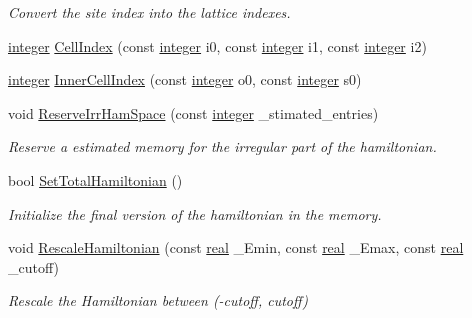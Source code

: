 \begin{DoxyCompactItemize}
\begin{DoxyCompactList}\small\item\em Convert the site index into the lattice indexes. \end{DoxyCompactList}\item 
\hyperlink{namespaceNumCal_ae1031b42812e871d8f5bd9b7b15fc7d8}{integer} \hyperlink{classNumCal_1_1Lattice_a35f73beef133e11d844a6632e582af65}{Cell\+Index} (const \hyperlink{namespaceNumCal_ae1031b42812e871d8f5bd9b7b15fc7d8}{integer} i0, const \hyperlink{namespaceNumCal_ae1031b42812e871d8f5bd9b7b15fc7d8}{integer} i1, const \hyperlink{namespaceNumCal_ae1031b42812e871d8f5bd9b7b15fc7d8}{integer} i2)
\item 
\hyperlink{namespaceNumCal_ae1031b42812e871d8f5bd9b7b15fc7d8}{integer} \hyperlink{classNumCal_1_1Lattice_af9b5d4ab5059d7e5bb3225d822881d9f}{Inner\+Cell\+Index} (const \hyperlink{namespaceNumCal_ae1031b42812e871d8f5bd9b7b15fc7d8}{integer} o0, const \hyperlink{namespaceNumCal_ae1031b42812e871d8f5bd9b7b15fc7d8}{integer} s0)
\item 
void \hyperlink{classNumCal_1_1Lattice_a9ec7fb19af2909219b0d82cdf26097a5}{Reserve\+Irr\+Ham\+Space} (const \hyperlink{namespaceNumCal_ae1031b42812e871d8f5bd9b7b15fc7d8}{integer} \+\_\+stimated\+\_\+entries)
\begin{DoxyCompactList}\small\item\em Reserve a estimated memory for the irregular part of the hamiltonian. \end{DoxyCompactList}\item 
bool \hyperlink{classNumCal_1_1Lattice_a6d68441bc15c6876230d3fac7bcdc26e}{Set\+Total\+Hamiltonian} ()
\begin{DoxyCompactList}\small\item\em Initialize the final version of the hamiltonian in the memory. \end{DoxyCompactList}\item 
void \hyperlink{classNumCal_1_1Lattice_a185a049be64061e61af9cf8aa98835db}{Rescale\+Hamiltonian} (const \hyperlink{namespaceNumCal_ac10564761316cff6fb75fe8bfccd6def}{real} \+\_\+\+Emin, const \hyperlink{namespaceNumCal_ac10564761316cff6fb75fe8bfccd6def}{real} \+\_\+\+Emax, const \hyperlink{namespaceNumCal_ac10564761316cff6fb75fe8bfccd6def}{real} \+\_\+cutoff)
\begin{DoxyCompactList}\small\item\em Rescale the Hamiltonian between (-\/cutoff, cutoff) \end{DoxyCompactList}\item 

\end{DoxyCompactItemize}

